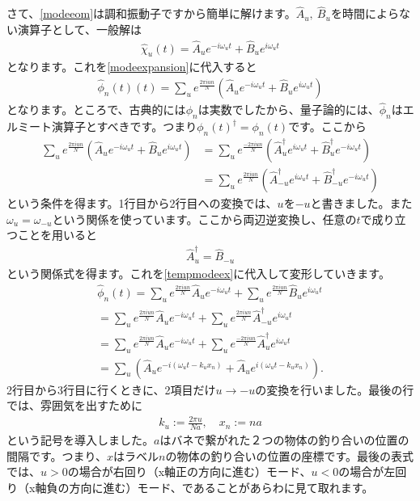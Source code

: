 \documentclass[report,paper=a4, fontsize=12pt, line_length=16cm, number_of_lines=33,dvipdfmx]{jlreq}
\numberwithin{equation}{chapter}
\newcommand{\phih}{\hat{\phi}}
\newcommand{\chih}{\hat{\chi}}
\newcommand{\Ah}{\widehat{A}}
\newcommand{\Bh}{\widehat{B}}
\begin{document}
さて、\eqref{modeeom}は調和振動子ですから簡単に解けます。$\Ah_u,\ \Bh_u$を時間によらない演算子として、一般解は
\begin{align}
  \chih_{u}(t)=\Ah_{u}e^{-i\omega_u t}+\Bh_{u}e^{i\omega_u t}
\end{align}
となります。これを\eqref{modeexpansion}に代入すると
\begin{align}
  \phih_{n}(t)(t)=\sum_{u}e^{\frac{2\pi i u n}{N}}
  (\Ah_{u}e^{-i\omega_u t}+\Bh_{u}e^{i\omega_u t})\label{tempmodeex}
\end{align}
となります。ところで、古典的には$\phi_n$は実数でしたから、量子論的には、$\phih_n$はエルミート演算子とすべきです。つまり$\phi_n(t)^{\dag}=\phi_n(t)$です。ここから
\begin{align}
  \sum_{u}e^{\frac{2\pi i u n}{N}}
  (\Ah_{u}e^{-i\omega_u t}+\Bh_{u}e^{i\omega_u t})
  &=\sum_{u}e^{\frac{-2\pi i u n}{N}}
  (\Ah_{u}^{\dag}e^{i\omega_u t}+\Bh_{u}^{\dag}e^{-i\omega_u t})\nonumber\\
  &=\sum_{u}e^{\frac{2\pi i u n}{N}}(\Ah_{-u}^{\dag}e^{i\omega_u t}+\Bh_{-u}^{\dag}e^{-i\omega_u t})
\end{align}
という条件を得ます。1行目から2行目への変換では、$u$を$-u$と書きました。また$\omega_{u}=\omega_{-u}$という関係を使っています。ここから両辺逆変換し、任意の$t$で成り立つことを用いると
\begin{align}
  \Ah_{u}^{\dag}=\Bh_{-u}
\end{align}
という関係式を得ます。これを\eqref{tempmodeex}に代入して変形していきます。
\begin{align}
  \phih_{n}(t)
  =\sum_{u}e^{\frac{2\pi i u n}{N}}\Ah_{u}e^{-i\omega_u t}+\sum_{u}e^{\frac{2\pi i u n}{N}}\Bh_{u}e^{i\omega_u t}\nonumber\\
  =\sum_{u}e^{\frac{2\pi i u n}{N}}\Ah_{u}e^{-i\omega_u t}+\sum_{u}e^{\frac{2\pi i u n}{N}}\Ah_{-u}^{\dag}e^{i\omega_u t}\nonumber\\
  =\sum_{u}e^{\frac{2\pi i u n}{N}}\Ah_{u}e^{-i\omega_u t}+\sum_{u}e^{\frac{-2\pi i u n}{N}}\Ah_{u}^{\dag}e^{i\omega_u t}\nonumber\\
  =\sum_{u}(\Ah_{u}e^{-i(\omega_u t-k_u x_n)}+\Ah_{u}e^{i(\omega_u t-k_u x_n)}).\label{tempmodeex2}
\end{align}
2行目から3行目に行くときに、2項目だけ$u\to -u$の変換を行いました。最後の行では、雰囲気を出すために
\begin{align}
  k_u:=\frac{2\pi u}{Na},\quad x_n:=na
\end{align}
という記号を導入しました。$a$はバネで繋がれた２つの物体の釣り合いの位置の間隔です。つまり、$x$はラベル$n$の物体の釣り合いの位置の座標です。最後の表式では、$u>0$の場合が右回り（x軸正の方向に進む）モード、$u<0$の場合が左回り（x軸負の方向に進む）モード、であることがあらわに見て取れます。
\end{document}
